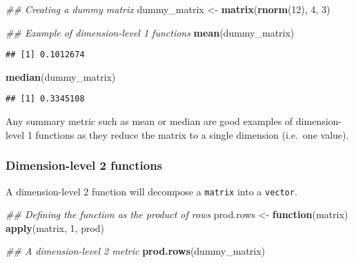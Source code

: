 \documentclass[
]{book}
\newenvironment{Shaded}{\begin{snugshade}}{\end{snugshade}}
\newcommand{\CommentTok}[1]{\textcolor[rgb]{0.56,0.35,0.01}{\textit{#1}}}
\newcommand{\ControlFlowTok}[1]{\textcolor[rgb]{0.13,0.29,0.53}{\textbf{#1}}}
\newcommand{\DecValTok}[1]{\textcolor[rgb]{0.00,0.00,0.81}{#1}}
\newcommand{\KeywordTok}[1]{\textcolor[rgb]{0.13,0.29,0.53}{\textbf{#1}}}
\newcommand{\NormalTok}[1]{#1}
\newcommand{\StringTok}[1]{\textcolor[rgb]{0.31,0.60,0.02}{#1}}
\begin{document}
\begin{Shaded}
\begin{Highlighting}[]
\CommentTok{\#\# Creating a dummy matrix}
\NormalTok{dummy\_matrix \textless{}{-}}\StringTok{ }\KeywordTok{matrix}\NormalTok{(}\KeywordTok{rnorm}\NormalTok{(}\DecValTok{12}\NormalTok{), }\DecValTok{4}\NormalTok{, }\DecValTok{3}\NormalTok{)}

\CommentTok{\#\# Example of dimension{-}level 1 functions}
\KeywordTok{mean}\NormalTok{(dummy\_matrix)}
\end{Highlighting}
\end{Shaded}

\begin{verbatim}
## [1] 0.1012674
\end{verbatim}

\begin{Shaded}
\begin{Highlighting}[]
\KeywordTok{median}\NormalTok{(dummy\_matrix)}
\end{Highlighting}
\end{Shaded}

\begin{verbatim}
## [1] 0.3345108
\end{verbatim}

Any summary metric such as mean or median are good examples of dimension-level 1 functions as they reduce the matrix to a single dimension (i.e.~one value).

\hypertarget{dimension-level-2-functions}{%
\subsubsection{Dimension-level 2 functions}\label{dimension-level-2-functions}}

A dimension-level 2 function will decompose a \texttt{matrix} into a \texttt{vector}.

\begin{Shaded}
\begin{Highlighting}[]
\CommentTok{\#\# Defining the function as the product of rows}
\NormalTok{prod.rows \textless{}{-}}\StringTok{ }\ControlFlowTok{function}\NormalTok{(matrix) }\KeywordTok{apply}\NormalTok{(matrix, }\DecValTok{1}\NormalTok{, prod)}

\CommentTok{\#\# A dimension{-}level 2 metric}
\KeywordTok{prod.rows}\NormalTok{(dummy\_matrix)}
\end{Highlighting}
\end{Shaded}
\end{document}
